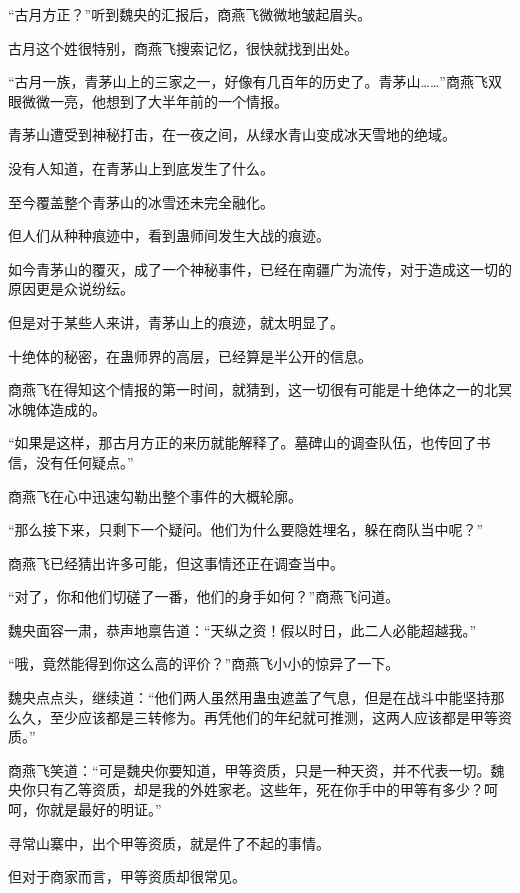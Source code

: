 
\begin{this_body}

“古月方正？”听到魏央的汇报后，商燕飞微微地皱起眉头。

古月这个姓很特别，商燕飞搜索记忆，很快就找到出处。

“古月一族，青茅山上的三家之一，好像有几百年的历史了。青茅山……”商燕飞双眼微微一亮，他想到了大半年前的一个情报。

青茅山遭受到神秘打击，在一夜之间，从绿水青山变成冰天雪地的绝域。

没有人知道，在青茅山上到底发生了什么。

至今覆盖整个青茅山的冰雪还未完全融化。

但人们从种种痕迹中，看到蛊师间发生大战的痕迹。

如今青茅山的覆灭，成了一个神秘事件，已经在南疆广为流传，对于造成这一切的原因更是众说纷纭。

但是对于某些人来讲，青茅山上的痕迹，就太明显了。

十绝体的秘密，在蛊师界的高层，已经算是半公开的信息。

商燕飞在得知这个情报的第一时间，就猜到，这一切很有可能是十绝体之一的北冥冰魄体造成的。

“如果是这样，那古月方正的来历就能解释了。墓碑山的调查队伍，也传回了书信，没有任何疑点。”

商燕飞在心中迅速勾勒出整个事件的大概轮廓。

“那么接下来，只剩下一个疑问。他们为什么要隐姓埋名，躲在商队当中呢？”

商燕飞已经猜出许多可能，但这事情还正在调查当中。

“对了，你和他们切磋了一番，他们的身手如何？”商燕飞问道。

魏央面容一肃，恭声地禀告道：“天纵之资！假以时日，此二人必能超越我。”

“哦，竟然能得到你这么高的评价？”商燕飞小小的惊异了一下。

魏央点点头，继续道：“他们两人虽然用蛊虫遮盖了气息，但是在战斗中能坚持那么久，至少应该都是三转修为。再凭他们的年纪就可推测，这两人应该都是甲等资质。”

商燕飞笑道：“可是魏央你要知道，甲等资质，只是一种天资，并不代表一切。魏央你只有乙等资质，却是我的外姓家老。这些年，死在你手中的甲等有多少？呵呵，你就是最好的明证。”

寻常山寨中，出个甲等资质，就是件了不起的事情。

但对于商家而言，甲等资质却很常见。


\end{this_body}
